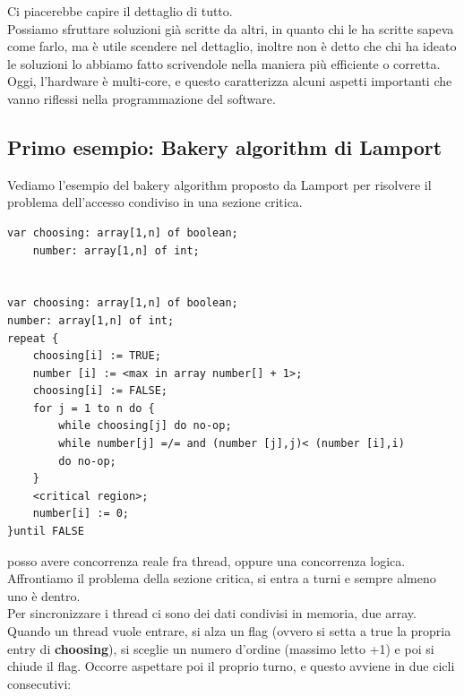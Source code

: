 \documentclass[14pt, oneside]{book}
\begin{document}
Ci piacerebbe capire il dettaglio di tutto.\\ Possiamo sfruttare soluzioni già scritte da altri, in quanto chi le ha scritte sapeva come farlo, ma è utile scendere nel dettaglio, inoltre non è detto che chi ha ideato le soluzioni lo abbiamo fatto scrivendole nella maniera più efficiente o corretta. Oggi, l'hardware è multi-core, e questo caratterizza alcuni aspetti importanti che vanno riflessi nella programmazione del software.
\subsection{Primo esempio: Bakery algorithm di Lamport}
Vediamo l'esempio del bakery algorithm proposto da Lamport per risolvere il problema dell'accesso condiviso in una sezione critica.
\begin{lstlisting}
var choosing: array[1,n] of boolean;
	number: array[1,n] of int;


var choosing: array[1,n] of boolean;
number: array[1,n] of int;
repeat {
	choosing[i] := TRUE;
	number [i] := <max in array number[] + 1>;
	choosing[i] := FALSE;
	for j = 1 to n do {
		while choosing[j] do no-op;
		while number[j] =/= and (number [j],j)< (number [i],i)
		do no-op;
	}
	<critical region>;
	number[i] := 0;
}until FALSE
\end{lstlisting}
posso avere concorrenza reale fra thread, oppure una concorrenza logica. Affrontiamo il problema della sezione critica, si entra a turni e sempre almeno uno è dentro.\\ Per sincronizzare i thread ci sono dei dati condivisi in memoria, due array.\\ Quando un thread vuole entrare, si alza un flag (ovvero si setta a true la propria entry di \textbf{choosing}), si sceglie un numero d'ordine (massimo letto +1) e poi si chiude il flag. Occorre aspettare poi il proprio turno, e questo avviene in due cicli consecutivi:
\end{document}
